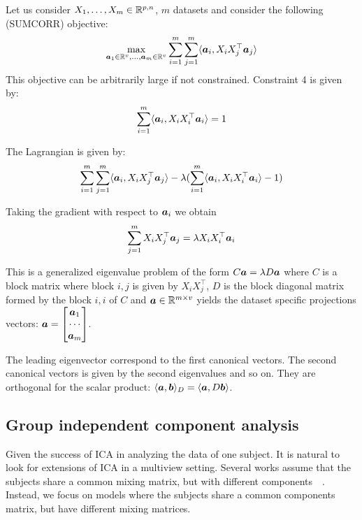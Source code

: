 Let us consider $X_1, \dots, X_m \in \mathbb{R}^{p, n}$, $m$ datasets and consider the following (SUMCORR)
objective:
\begin{align}
  \max_{\boldsymbol{a}_1 \in \mathbb{R}^{v}, \dots, \boldsymbol{a}_m \in \mathbb{R}^{v}} \sum_{i=1}^m \sum_{j=1}^m \langle{ \boldsymbol{a}_i },{ X_i X_j^{\top} \boldsymbol{a}_j }\rangle
\end{align}
This objective can be arbitrarily large if not constrained. Constraint 4 is
given by:
\begin{align}
  \sum_{i=1}^m \langle{ \boldsymbol{a}_i },{ X_i X_i^{\top} \boldsymbol{a}_i }\rangle = 1
\end{align}

The Lagrangian is given by:
\begin{align}
  \sum_{i=1}^m \sum_{j=1}^m \langle{ \boldsymbol{a}_i },{ X_i X_j^{\top} \boldsymbol{a}_j }\rangle - \lambda (\sum_{i=1}^m
  \langle{ \boldsymbol{a}_i },{X_i X_i^{\top} \boldsymbol{a}_i }\rangle - 1)
\end{align}

Taking the gradient with respect to $\boldsymbol{a}_i$ we obtain
\begin{align}
  \sum_{j=1}^m X_i X_j^{\top} \boldsymbol{a}_j = \lambda X_i X_i^{\top} \boldsymbol{a}_i
\end{align}

This is a generalized eigenvalue problem of the form $C \boldsymbol{a} = \lambda D \boldsymbol{a}$
where $C$ is a block matrix where block $i,j$ is given by $X_i X_j^{\top}$, 
$D$ is the block diagonal matrix formed by the block $i, i$ of $C$ and $\boldsymbol{a} \in
\mathbb{R}^{m \times v}$ yields the dataset specific projections vectors: $\boldsymbol{a} = \begin{bmatrix} \boldsymbol{a}_1 \\ \cdots \\
  \boldsymbol{a}_m \end{bmatrix}$.

    The leading eigenvector correspond to the first canonical vectors. The
    second canonical vectors is given by the second eigenvalues and so on. They
    are orthogonal for the scalar product: $\langle{ \boldsymbol{a}},{ \boldsymbol{b}  }\rangle_D =
    \langle{ \boldsymbol{a}},{ D \boldsymbol{b}  }\rangle$.

  
\subsection{Group independent component analysis}
\label{sec:groupica}
Given the success of ICA in analyzing the data of one subject. It is natural to
look for extensions of ICA in a multiview setting.
Several works assume that the subjects share a common mixing matrix, but with different components~\cite{pfister2019robustifying}~\cite{svensen2002ica}.
% 
Instead, we focus on models where the subjects share a common components matrix, but have different mixing matrices.

